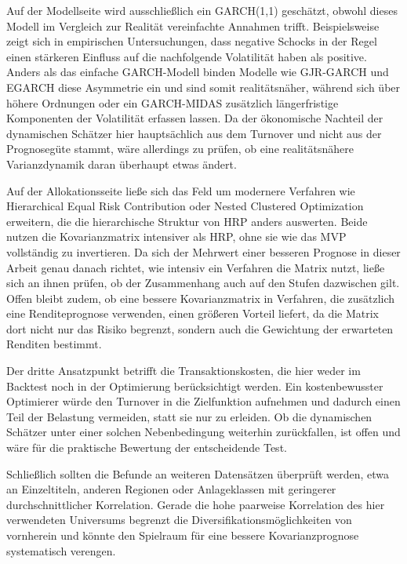 \documentclass[12pt,a4paper]{article}
\begin{document}
Auf der Modellseite wird ausschließlich ein GARCH(1,1) geschätzt, obwohl dieses Modell im Vergleich zur Realität vereinfachte Annahmen trifft.
Beispielsweise zeigt sich in empirischen Untersuchungen, dass negative Schocks in der Regel einen stärkeren Einfluss auf die nachfolgende Volatilität haben als positive.
Anders als das einfache GARCH-Modell binden Modelle wie GJR-GARCH und EGARCH diese Asymmetrie ein und sind somit realitätsnäher, während sich über höhere Ordnungen oder ein GARCH-MIDAS zusätzlich längerfristige Komponenten der Volatilität erfassen lassen.
Da der ökonomische Nachteil der dynamischen Schätzer hier hauptsächlich aus dem Turnover und nicht aus der Prognosegüte stammt, wäre allerdings zu prüfen, ob eine realitätsnähere Varianzdynamik daran überhaupt etwas ändert.

Auf der Allokationsseite ließe sich das Feld um modernere Verfahren wie Hierarchical Equal Risk Contribution \parencite{raffinot2018herc} oder Nested Clustered Optimization \parencite{deprado2019nco} erweitern, die die hierarchische Struktur von HRP anders auswerten.
Beide nutzen die Kovarianzmatrix intensiver als HRP, ohne sie wie das MVP vollständig zu invertieren.
Da sich der Mehrwert einer besseren Prognose in dieser Arbeit genau danach richtet, wie intensiv ein Verfahren die Matrix nutzt, ließe sich an ihnen prüfen, ob der Zusammenhang auch auf den Stufen dazwischen gilt.
Offen bleibt zudem, ob eine bessere Kovarianzmatrix in Verfahren, die zusätzlich eine Renditeprognose verwenden, einen größeren Vorteil liefert, da die Matrix dort nicht nur das Risiko begrenzt, sondern auch die Gewichtung der erwarteten Renditen bestimmt.

Der dritte Ansatzpunkt betrifft die Transaktionskosten, die hier weder im Backtest noch in der Optimierung berücksichtigt werden.
Ein kostenbewusster Optimierer würde den Turnover in die Zielfunktion aufnehmen und dadurch einen Teil der Belastung vermeiden, statt sie nur zu erleiden.
Ob die dynamischen Schätzer unter einer solchen Nebenbedingung weiterhin zurückfallen, ist offen und wäre für die praktische Bewertung der entscheidende Test.

Schließlich sollten die Befunde an weiteren Datensätzen überprüft werden, etwa an Einzeltiteln, anderen Regionen oder Anlageklassen mit geringerer durchschnittlicher Korrelation.
Gerade die hohe paarweise Korrelation des hier verwendeten Universums begrenzt die Diversifikationsmöglichkeiten von vornherein und könnte den Spielraum für eine bessere Kovarianzprognose systematisch verengen.
\end{document}
